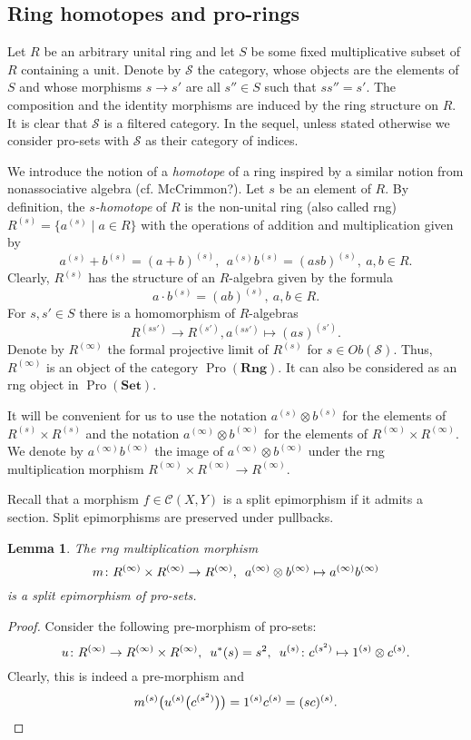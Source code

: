 \documentclass{article}
\newtheorem{lemma}{Lemma}
\newcommand{\rar}{\rightarrow}
\newcommand{\Set}{\mathbf{Set}}
\newcommand{\Rng}{\mathbf{Rng}}
\DeclareMathOperator{\Pro}{Pro}
\begin{document}
\subsection{Ring homotopes and pro-rings}
Let $R$ be an arbitrary unital ring and let \(S\) be some fixed multiplicative subset of $R$ containing a unit. Denote by $\mathcal{S}$ the category, whose objects are the elements of \(S\) and whose morphisms \(s \rar s'\) are all \(s'' \in S\) such that \(ss'' = s'\). The composition and the identity morphisms are induced by the ring structure on $R$. It is clear that $\mathcal{S}$ is a filtered category. In the sequel, unless stated otherwise we consider pro-sets with \(\mathcal S\) as their category of indices.

We introduce the notion of a {\it homotope} of a ring inspired by a similar notion from nonassociative algebra (cf. McCrimmon?). Let $s$ be an element of $R$.  By definition, the {\it \(s\)-homotope} of \(R\) is the non-unital ring (also called rng) \(R^{(s)} = \{a^{(s)} \mid a \in R\}\) with the operations of addition and multiplication given by
\[ a^{(s)} + b^{(s)} = (a + b)^{(s)},\ \ a^{(s)} b^{(s)} = (asb)^{(s)},\ a, b\in R.\]
Clearly, $R^{(s)}$ has the structure of an \(R\)-algebra given by the formula \[a \cdot b^{(s)} = (ab)^{(s)},\ a, b \in R.\] For \(s, s' \in S\) there is a homomorphism of \(R\)-algebras \[R^{(ss')} \rar R^{(s')}, a^{(ss')} \mapsto (as)^{(s')}.\]
Denote by \(R^{(\infty)}\) the formal projective limit of \(R^{(s)}\) for \(s \in Ob(\mathcal S)\). Thus, $R^{(\infty)}$ is an object of the category $\Pro(\Rng)$. It can also be considered as an rng object in \(\Pro(\Set)\). 

It will be convenient for us to use the notation \(a^{(s)} \otimes b^{(s)}\) for the elements of \(R^{(s)} \times R^{(s)}\) and the notation \(a^{(\infty)} \otimes b^{(\infty)}\) for the elements of \(R^{(\infty)} \times R^{(\infty)}\). We denote by $a^{(\infty)} b^{(\infty)}$ the image of \(a^{(\infty)} \otimes b^{(\infty)}\) under the rng multiplication morphism  \(R^{(\infty)} \times R^{(\infty)} \rar R^{(\infty)}\).

Recall that a morphism \(f \in \mathcal C(X, Y)\) is a split epimorphism if it admits a section. Split epimorphisms are preserved under pullbacks.

\begin{lemma}\label{RingGeneration}
The rng multiplication morphism
\[m \colon R^{(\infty)} \times R^{(\infty)} \rar R^{(\infty)}, \enskip a^{(\infty)} \otimes b^{(\infty)} \mapsto a^{(\infty)} b^{(\infty)}\]
is a split epimorphism of pro-sets.
\end{lemma}
\begin{proof}
Consider the following pre-morphism of pro-sets:
\[u \colon R^{(\infty)} \rar R^{(\infty)} \times R^{(\infty)}, \enskip u^*(s) = s^2, \enskip u^{(s)} \colon c^{(s^2)} \mapsto 1^{(s)} \otimes c^{(s)}.\]
Clearly, this is indeed a pre-morphism and
\[
m^{(s)}\bigl(u^{(s)}\bigl(c^{(s^2)}\bigr)\bigr) = 1^{(s)} c^{(s)} = (sc)^{(s)}.\qedhere
\]
\end{proof}
\end{document}
